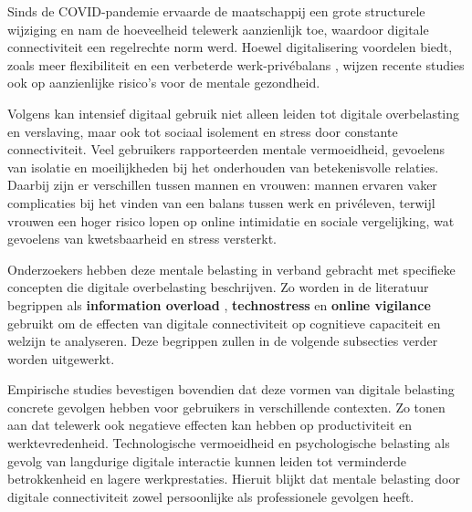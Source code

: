 \vspace{1em}

Sinds de COVID-pandemie ervaarde de maatschappij een grote structurele wijziging en nam de hoeveelheid telewerk aanzienlijk toe, waardoor digitale connectiviteit een regelrechte norm werd. Hoewel digitalisering voordelen biedt, zoals meer flexibiliteit en een verbeterde werk-privébalans \autocite{Bondanini2025}, wijzen recente studies ook op aanzienlijke risico’s voor de mentale gezondheid.

\vspace{1em}

Volgens \textcite{Malik2025} kan intensief digitaal gebruik niet alleen leiden tot digitale overbelasting en verslaving, maar ook tot sociaal isolement en stress door constante connectiviteit. Veel gebruikers rapporteerden mentale vermoeidheid, gevoelens van isolatie en moeilijkheden bij het onderhouden van betekenisvolle relaties. Daarbij zijn er verschillen tussen mannen en vrouwen: mannen ervaren vaker complicaties bij het vinden van een balans tussen werk en privéleven, terwijl vrouwen een hoger risico lopen op online intimidatie en sociale vergelijking, wat gevoelens van kwetsbaarheid en stress versterkt.

\vspace{1em}

Onderzoekers hebben deze mentale belasting in verband gebracht met specifieke concepten die digitale overbelasting beschrijven. Zo worden in de literatuur begrippen als \textbf{information overload} \autocite{Schmitt2021}, \textbf{technostress} \autocite{SanjeevaKumar2024} en \textbf{online vigilance} \autocite{Reinecke2018} gebruikt om de effecten van digitale connectiviteit op cognitieve capaciteit en welzijn te analyseren. Deze begrippen zullen in de volgende subsecties verder worden uitgewerkt.

\vspace{1em}

Empirische studies bevestigen bovendien dat deze vormen van digitale belasting concrete gevolgen hebben voor gebruikers in verschillende contexten. Zo tonen \textcite{Costin2023} aan dat telewerk ook negatieve effecten kan hebben op productiviteit en werktevredenheid. Technologische vermoeidheid en psychologische belasting als gevolg van langdurige digitale interactie kunnen leiden tot verminderde betrokkenheid en lagere werkprestaties. Hieruit blijkt dat mentale belasting door digitale connectiviteit zowel persoonlijke als professionele gevolgen heeft.

